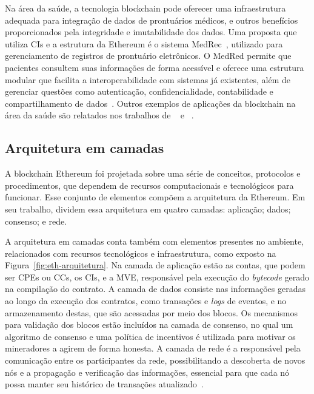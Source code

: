 Na área da saúde, a tecnologia blockchain pode oferecer uma infraestrutura adequada para integração de dados de prontuários médicos, e outros benefícios proporcionados pela integridade e imutabilidade dos dados. Uma proposta que utiliza CIs e a estrutura da Ethereum é o sistema MedRec~\cite{ekblaw2016case-medrec}, utilizado para gerenciamento de registros de prontuário eletrônicos. O MedRed permite que pacientes consultem suas informações de forma acessível e oferece uma estrutura modular que facilita a interoperabilidade com sistemas já existentes, além de gerenciar questões como autenticação, confidencialidade, contabilidade e compartilhamento de dados~\cite{ekblaw2016case-medrec}. Outros exemplos de aplicações da blockchain na área da saúde são relatados nos trabalhos de ~ e ~.


\subsection{Arquitetura em camadas} \label{tex:fund:ethereum:camadas}


A blockchain Ethereum foi projetada sobre uma série de conceitos, protocolos e procedimentos, que dependem de recursos computacionais e tecnológicos para funcionar. Esse conjunto de elementos compõem a arquitetura da Ethereum. Em seu trabalho,  dividem essa arquitetura em quatro camadas: aplicação; dados; consenso; e rede. 

A arquitetura em camadas conta também com elementos presentes no ambiente, relacionados com recursos tecnológicos e infraestrutura, como exposto na Figura~\ref{fig:eth-arquitetura}. Na camada de aplicação estão as contas, que podem ser CPEs ou CCs, os CIs, e a MVE, responsável pela execução do \textit{bytecode} gerado na compilação do contrato. A camada de dados consiste nas informações geradas ao longo da execução dos contratos, como transações e \textit{logs} de eventos, e no armazenamento destas, que são acessadas por meio dos blocos. Os mecanismos para validação dos blocos estão incluídos na camada de consenso, no qual um algoritmo de consenso e uma política de incentivos é utilizada para motivar os mineradores a agirem de forma honesta. A camada de rede é a responsável pela comunicação entre os participantes da rede, possibilitando a descoberta de novos nós e a propagação e verificação das informações, essencial para que cada nó possa manter seu histórico de transações atualizado~\cite{chen2020survey-ethereum-acm}.    


